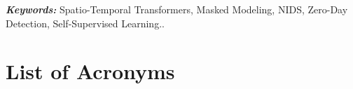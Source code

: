 \documentclass[12pt, a4paper]{report}
\begin{document}
\vspace{1cm}
\textbf{\textit{Keywords:}} Spatio-Temporal Transformers, Masked Modeling, NIDS, Zero-Day Detection, Self-Supervised Learning..


\tableofcontents
\listoftables
\listoffigures

\part*{List of Acronyms}
\end{document}
